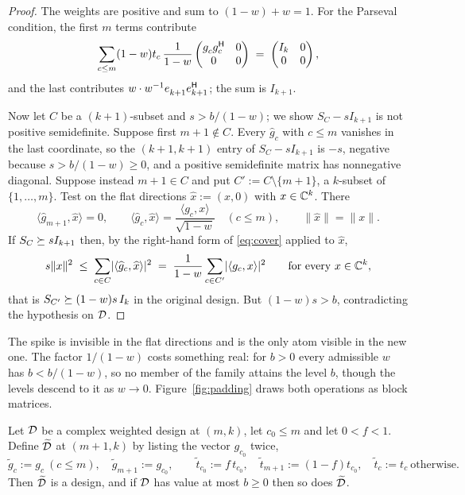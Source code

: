 \begin{proof}
The weights are positive and sum to $(1-w)+w=1$.  For the Parseval
condition, the first $m$ terms contribute
\[
  \sum_{c\le m}(1-w)t_c\,
  \frac{1}{1-w}\begin{pmatrix}g_c^{\vphantom{\mathsf{H}}}g_c\adj&0\\0&0\end{pmatrix}
  \;=\;\begin{pmatrix}I_k&0\\0&0\end{pmatrix},
\]
and the last contributes $w\cdot w^{-1}e_{k+1}^{\vphantom{\mathsf{H}}}e_{k+1}\adj$;
the sum is $I_{k+1}$.

Now let $C$ be a $(k+1)$-subset and $s>b/(1-w)$; we show $S_C-sI_{k+1}$ is
not positive semidefinite.  Suppose first $m+1\notin C$.  Every
$\widehat g_c$ with $c\le m$ vanishes in the last coordinate, so the
$(k+1,k+1)$ entry of $S_C-sI_{k+1}$ is $-s$, negative because
$s>b/(1-w)\ge0$, and a positive semidefinite matrix has nonnegative
diagonal.  Suppose instead $m+1\in C$ and put
$C':=C\setminus\{m+1\}$, a $k$-subset of $\{1,\dots,m\}$.  Test on the
flat directions $\widehat x:=(x,0)$ with $x\in\mathbb{C}^k$.  There
\[
  \langle\widehat g_{m+1},\widehat x\rangle=0,
  \qquad
  \langle\widehat g_c,\widehat x\rangle
  =\frac{\langle g_c,x\rangle}{\sqrt{1-w}}\quad(c\le m),
  \qquad
  \lVert\widehat x\rVert=\lVert x\rVert .
\]
If $S_C\succeq sI_{k+1}$ then, by the right-hand form of \eqref{eq:cover}
applied to $\widehat x$,
\[
  s\lVert x\rVert^{2}
  \;\le\;\sum_{c\in C}\lvert\langle\widehat g_c,\widehat x\rangle\rvert^{2}
  \;=\;\frac{1}{1-w}\sum_{c\in C'}\lvert\langle g_c,x\rangle\rvert^{2}
  \qquad\text{for every }x\in\mathbb{C}^{k},
\]
that is $S_{C'}\succeq (1-w)s\,I_k$ in the original design.  But
$(1-w)s>b$, contradicting the hypothesis on $\mathcal{D}$.
\end{proof}

The spike is invisible in the flat directions and is the only atom
visible in the new one.  The factor $1/(1-w)$ costs something real: for
$b>0$ every admissible $w$ has $b<b/(1-w)$, so no member of the family
attains the level $b$, though the levels descend to it as $w\to0$.
Figure~\ref{fig:padding} draws both operations as block matrices.

\begin{lemma}[Lean]\label{lem:split}
Let $\mathcal{D}$ be a complex weighted design at $(m,k)$, let $c_0\le m$ and let
$0<f<1$.  Define $\widetilde{\mathcal{D}}$ at $(m+1,k)$ by listing the vector
$g_{c_0}$ twice,
\[
  \widetilde g_c:=g_c\ (c\le m),
  \quad \widetilde g_{m+1}:=g_{c_0},
  \qquad
  \widetilde t_{c_0}:=f\,t_{c_0},
  \quad \widetilde t_{m+1}:=(1-f)t_{c_0},
  \quad \widetilde t_c:=t_c\ \text{otherwise.}
\]
Then $\widetilde{\mathcal{D}}$ is a design, and if $\mathcal{D}$ has value at most $b\ge0$ then
so does $\widetilde{\mathcal{D}}$.
\end{lemma}

